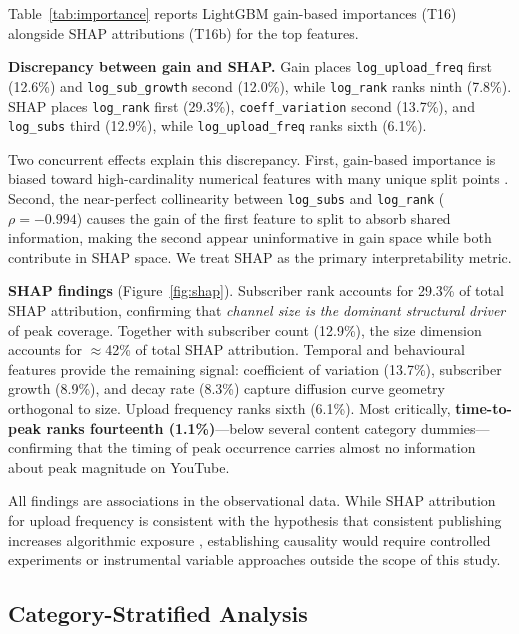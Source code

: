 \documentclass[journal,article,submit,pdftex,moreauthors]{Definitions/mdpi}
\begin{document}
Table~\ref{tab:importance} reports LightGBM gain-based importances (T16)
alongside SHAP attributions (T16b) for the top features.

\textbf{Discrepancy between gain and SHAP.}
Gain places \texttt{log\_upload\_freq} first (12.6\%) and
\texttt{log\_sub\_growth} second (12.0\%), while \texttt{log\_rank}
ranks ninth (7.8\%).
SHAP places \texttt{log\_rank} first (29.3\%), \texttt{coeff\_variation}
second (13.7\%), and \texttt{log\_subs} third (12.9\%), while
\texttt{log\_upload\_freq} ranks sixth (6.1\%).

Two concurrent effects explain this discrepancy.
First, gain-based importance is biased toward high-cardinality numerical
features with many unique split points \cite{ref-lundberg2019}.
Second, the near-perfect collinearity between \texttt{log\_subs} and
\texttt{log\_rank} ($\rho = -0.994$) causes the gain of the first feature
to split to absorb shared information, making the second appear
uninformative in gain space while both contribute in SHAP space.
We treat SHAP as the primary interpretability metric.

\textbf{SHAP findings} (Figure~\ref{fig:shap}).
Subscriber rank accounts for 29.3\% of total SHAP attribution, confirming
that \emph{channel size is the dominant structural driver} of peak
coverage.
Together with subscriber count (12.9\%), the size dimension accounts for
$\approx$42\% of total SHAP attribution.
Temporal and behavioural features provide the remaining signal:
coefficient of variation (13.7\%), subscriber growth (8.9\%), and decay
rate (8.3\%) capture diffusion curve geometry orthogonal to size.
Upload frequency ranks sixth (6.1\%).
Most critically, \textbf{time-to-peak ranks fourteenth (1.1\%)}---below
several content category dummies---confirming that the timing of peak
occurrence carries almost no information about peak magnitude on YouTube.

All findings are associations in the observational data.
While SHAP attribution for upload frequency is consistent with the
hypothesis that consistent publishing increases algorithmic exposure
\cite{ref-covington2016}, establishing causality would require controlled
experiments or instrumental variable approaches outside the scope of this
study.

\subsection{Category-Stratified Analysis}
\label{sec:category}
\end{document}
